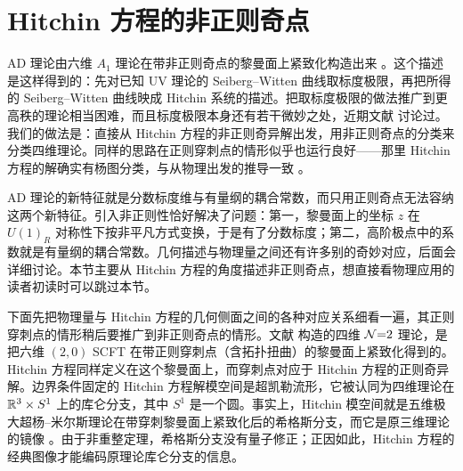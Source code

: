 \section{Hitchin 方程的非正则奇点}
\label{sec:hitchin}

AD 理论由六维 $A_1$ 理论在带非正则奇点的黎曼面上紧致化构造出来 \cite{3}。这个描述是这样得到的：先对已知 UV 理论的 Seiberg--Witten 曲线取标度极限，再把所得的 Seiberg--Witten 曲线映成 Hitchin 系统的描述。把取标度极限的做法推广到更高秩的理论相当困难，而且标度极限本身还有若干微妙之处，近期文献 \cite{22} 讨论过。我们的做法是：直接从 Hitchin 方程的非正则奇异解出发，用非正则奇点的分类来分类四维理论。同样的思路在正则穿刺点的情形似乎也运行良好——那里 Hitchin 方程的解确实有杨图分类，与从物理出发的推导一致 \cite{23}。


AD 理论的新特征就是分数标度维与有量纲的耦合常数，而只用正则奇点无法容纳这两个新特征。引入非正则性恰好解决了问题：第一，黎曼面上的坐标 $z$ 在 $U(1)_R$ 对称性下按非平凡方式变换，于是有了分数标度；第二，高阶极点中的系数就是有量纲的耦合常数。几何描述与物理量之间还有许多别的奇妙对应，后面会详细讨论。本节主要从 Hitchin 方程的角度描述非正则奇点，想直接看物理应用的读者初读时可以跳过本节。

下面先把物理量与 Hitchin 方程的几何侧面之间的各种对应关系细看一遍，其正则穿刺点的情形稍后要推广到非正则奇点的情形。文献 \cite{2} 构造的四维 $\mathcal{N}{=}2$ 理论，是把六维 $(2,0)$ SCFT 在带正则穿刺点（含拓扑扭曲）的黎曼面上紧致化得到的。Hitchin 方程同样定义在这个黎曼面上，而穿刺点对应于 Hitchin 方程的正则奇异解。边界条件固定的 Hitchin 方程解模空间是超凯勒流形，它被认同为四维理论在 $\mathbb{R}^3\times S^1$ 上的库仑分支，其中 $S^1$ 是一个圆。事实上，Hitchin 模空间就是五维极大超杨–米尔斯理论在带穿刺黎曼面上紧致化后的希格斯分支，而它是原三维理论的镜像 \cite{24}。由于非重整定理，希格斯分支没有量子修正；正因如此，Hitchin 方程的经典图像才能编码原理论库仑分支的信息。

